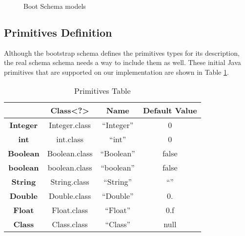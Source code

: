 \begin{figure}[H]
	\centering
  	\caption{Boot Schema models}
  	\label{fig:schema_schema_models}
\end{figure}

\subsection{Primitives Definition}\label{Primitives Definition}
Although the bootstrap schema defines the primitives types for its description, the real schema schema needs a way to include them as well.
These initial Java primitives that are supported on our implementation are shown in Table \ref{tbl:primivites_table}.

\begin{table}[H]
	\centering
	\begin{tabular}{c|ccc}
	\cline{2-4}
	\multicolumn{1}{l|}{\textbf{}}         & \multicolumn{1}{c|}{\textbf{Class\textless?\textgreater}} & \multicolumn{1}{c|}{\textbf{Name}} & \multicolumn{1}{c|}{\textbf{Default Value}} \\ \hline
	\multicolumn{1}{|c|}{\textbf{Integer}} & Integer.class                                             & ``Integer''                          & 0                                           \\ \cline{1-1}
	\multicolumn{1}{|c|}{\textbf{int}}     & int.class                                                 & ``int''                              & 0                                           \\ \cline{1-1}
	\multicolumn{1}{|c|}{\textbf{Boolean}} & Boolean.class                                             & ``Boolean''                          & false                                       \\ \cline{1-1}
	\multicolumn{1}{|c|}{\textbf{boolean}} & boolean.class                                             & ``boolean''                          & false                                       \\ \cline{1-1}
	\multicolumn{1}{|c|}{\textbf{String}}  & String.class                                              & ``String''                           & ``''                                          \\ \cline{1-1}
	\multicolumn{1}{|c|}{\textbf{Double}}  & Double.class                                              & ``Double''                           & 0.                                          \\ \cline{1-1}
	\multicolumn{1}{|c|}{\textbf{Float}}   & Float.class                                               & ``Float''                            & 0.f                                         \\ \cline{1-1}
	\multicolumn{1}{|c|}{\textbf{Class}}   & Class.class                                               & ``Class''                            & null                                        \\ \cline{1-1}
	\end{tabular}
	\caption{Primitives Table}
	\label{tbl:primivites_table}
\end{table}

